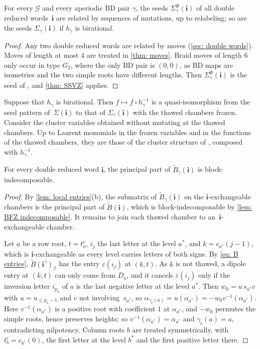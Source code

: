\documentclass[a4paper]{amsart}
\numberwithin{equation}{section}
\theoremstyle{definition}
\theoremstyle{remark}
\newcommand{\mcG}{\mathcal{G}}
\newcommand{\mcI}{\mathcal{I}}
\newcommand{\bfi}{\mathbf{i}}
\newcommand{\tB}{\widetilde{B}}
\newcommand{\rr}{\mathrm{r}}
\newcommand{\cc}{\mathrm{c}}
\begin{document}
\begin{corollary}
  \label{cor: mutation equivalent}
  For every $\mcG$ and every aperiodic BD pair $\gamma$, the seeds $\Sigma^\Phi_\gamma(\bfi)$ of all double reduced words~$\bfi$ are related by sequences of mutations, up to relabeling; so are the seeds $\Sigma_\gamma(\bfi)$ if $h_\gamma$ is birational.
\end{corollary}
\begin{proof}

  Any two double reduced words are related by moves (\cref{sec: double words}).
  Moves of length at most $4$ are treated in \cref{thm: moves}.
  Braid moves of length $6$ only occur in type $G_2$, where the only BD pair is $(0,0)$, as BD maps are isometries and the two simple roots have different lengths.
  Then $\Sigma^\Phi_\gamma(\bfi)$ is the seed of \cite[Theorem~2.10]{BFZ05}, and \cref{thm: SSVZ} applies.
\end{proof}

Suppose that $h_\gamma$ is birational.
Then $f\mapsto f\circ h_\gamma^{-1}$ is a quasi-isomorphism from the seed pattern of~$\Sigma(\bfi)$ to that of $\Sigma_\gamma(\bfi)$ with the thawed chambers frozen.
Consider the cluster variables obtained without mutating at the thawed chambers.
Up to Laurent monomials in the frozen variables and in the functions of the thawed chambers, they are those of the cluster structure of \cite{BFZ05}, composed with $h_\gamma^{-1}$.

\begin{lemma}
  \label{lem: indecomposable}
  For every double reduced word $\bfi$, the principal part of $\tB_\gamma(\bfi)$ is block-indecomposable.
\end{lemma}
\begin{proof}
  By \cref{lem: local entries}(b), the submatrix of $\tB_\gamma(\bfi)$ on the $\bfi$-exchangeable chambers is the principal part of $\tB(\bfi)$, which is block-indecomposable by \cref{lem: BFZ indecomposable}.
  It remains to join each thawed chamber to an~$\bfi$-exchangeable chamber.

  Let $a$ be a row root, $t=t^\rr_a$, $i_j$ the last letter at the level $a^*$, and $k=c_{a^*}(j-1)$, which is $\bfi$-exchangeable as every level carries letters of both signs.
  By \eqref{eq: B entries}, $\tB(\bfi^\gamma)_\mcI$ has the entry $\varepsilon(i_j)$ at $(k,t)$.
  As $k$ is not thawed, a dipole entry at $(k,t)$ can only come from $D_a$, and it cancels $\varepsilon(i_j)$ only if the inversion letter $i_{p_a}$ of $a$ is the last negative letter at the level $a^*$.
  Then $w_0=u\,s_{a^*}v$ with $u=u_{\le p_a-1}$ and $v$ not involving~$s_{a^*}$, so $\alpha_{\gamma_{\rr}(a)}=u(\alpha_{a^*})=-w_0v^{-1}(\alpha_{a^*})$.
  Here $v^{-1}(\alpha_{a^*})$ is a positive root with coefficient $1$ at $\alpha_{a^*}$, and $-w_0$ permutes the simple roots, hence preserves heights; so $v^{-1}(\alpha_{a^*})=\alpha_{a^*}$ and $\gamma_{\rr}(a)=a$, contradicting nilpotency.
  Column roots $b$ are treated symmetrically, with $t^\cc_b=c_{b^*}(0)$, the first letter at the level $b^*$ and the first positive letter there.
\end{proof}
\end{document}
